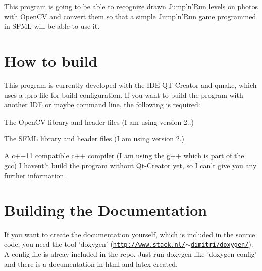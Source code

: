 This program is going to be able to recognize drawn Jump'n'Run levels on photos with Open\-C\-V and convert them so that a simple Jump'n'Run game programmed in S\-F\-M\-L will be able to use it.

\section*{How to build }

This program is currently developed with the I\-D\-E Q\-T-\/\-Creator and qmake, which uses a .pro file for build configuration. If you want to build the program with another I\-D\-E or maybe command line, the following is required\-:
\begin{DoxyItemize}
\item The Open\-C\-V library and header files (I am using version 2..)
\item The S\-F\-M\-L library and header files (I am using version 2.)
\item A c++11 compatible c++ compiler (I am using the g++ which is part of the gcc) I havent't build the program without Qt-\/\-Creator yet, so I can't give you any further information.
\end{DoxyItemize}

\section*{Building the Documentation }

If you want to create the documentation yourself, which is included in the source code, you need the tool 'doxygen' (\href{http://www.stack.nl/~dimitri/doxygen/}{\tt http\-://www.\-stack.\-nl/$\sim$dimitri/doxygen/}). A config file is alreay included in the repo. Just run doxygen like 'doxygen config' and there is a documentation in html and latex created. 
